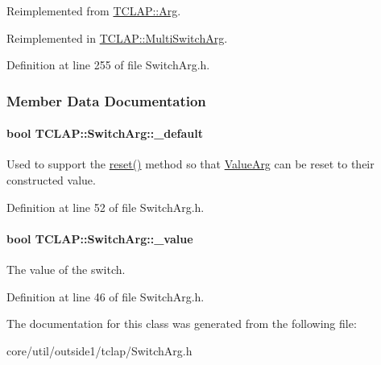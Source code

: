 Reimplemented from \hyperlink{classTCLAP_1_1Arg_ab5b5dc9a9b0381561f0684523f943a2c}{T\+C\+L\+A\+P\+::\+Arg}.



Reimplemented in \hyperlink{classTCLAP_1_1MultiSwitchArg_ac320530811dbca7fdcb2a41ab252fce4}{T\+C\+L\+A\+P\+::\+Multi\+Switch\+Arg}.



Definition at line 255 of file Switch\+Arg.\+h.



\subsubsection{Member Data Documentation}
\paragraph[{\texorpdfstring{\+\_\+default}{_default}}]{\setlength{\rightskip}{0pt plus 5cm}bool T\+C\+L\+A\+P\+::\+Switch\+Arg\+::\+\_\+default\hspace{0.3cm}{\ttfamily [protected]}}\hypertarget{classTCLAP_1_1SwitchArg_ae25a99eb06fc2ee75a3b98edba1d5d8d}{}\label{classTCLAP_1_1SwitchArg_ae25a99eb06fc2ee75a3b98edba1d5d8d}
Used to support the \hyperlink{classTCLAP_1_1SwitchArg_af8561d903ec3c11f5f2175e6db179d9c}{reset()} method so that \hyperlink{classTCLAP_1_1ValueArg}{Value\+Arg} can be reset to their constructed value. 

Definition at line 52 of file Switch\+Arg.\+h.

\paragraph[{\texorpdfstring{\+\_\+value}{_value}}]{\setlength{\rightskip}{0pt plus 5cm}bool T\+C\+L\+A\+P\+::\+Switch\+Arg\+::\+\_\+value\hspace{0.3cm}{\ttfamily [protected]}}\hypertarget{classTCLAP_1_1SwitchArg_a0389ecebecc504d9756703d46e8cf3ca}{}\label{classTCLAP_1_1SwitchArg_a0389ecebecc504d9756703d46e8cf3ca}
The value of the switch. 

Definition at line 46 of file Switch\+Arg.\+h.



The documentation for this class was generated from the following file\+:\begin{DoxyCompactItemize}
\item 
core/util/outside1/tclap/Switch\+Arg.\+h\end{DoxyCompactItemize}
